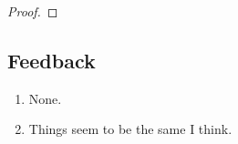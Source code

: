 \documentclass[11pt]{article}
\newcommand{\cbr}[1]{\left\{#1\right\}}
\begin{document}
\begin{enumerate}
\begin{proof}
    \end{proof}
\end{enumerate}
\subsection*{Feedback}
\begin{enumerate}
    \item None.
    \item Things seem to be the same I think.
\end{enumerate}
\end{document}
